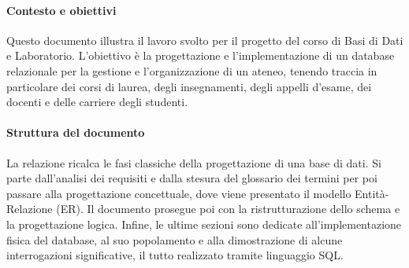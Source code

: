 \paragraph{Contesto e obiettivi}
Questo documento illustra il lavoro svolto per il progetto del corso di Basi di Dati e Laboratorio.
L'obiettivo è la progettazione e l'implementazione di un database relazionale per la gestione e l'organizzazione di un ateneo, tenendo traccia in particolare dei corsi di laurea, degli insegnamenti, degli appelli d'esame, dei docenti e delle carriere degli studenti.

\paragraph{Struttura del documento}
La relazione ricalca le fasi classiche della progettazione di una base di dati.
Si parte dall'analisi dei requisiti e dalla stesura del glossario dei termini per poi passare alla progettazione concettuale, dove viene presentato il modello Entità-Relazione (ER).
Il documento prosegue poi con la ristrutturazione dello schema e la progettazione logica.
Infine, le ultime sezioni sono dedicate all'implementazione fisica del database, al suo popolamento e alla dimostrazione di alcune interrogazioni significative, il tutto realizzato tramite linguaggio SQL.
